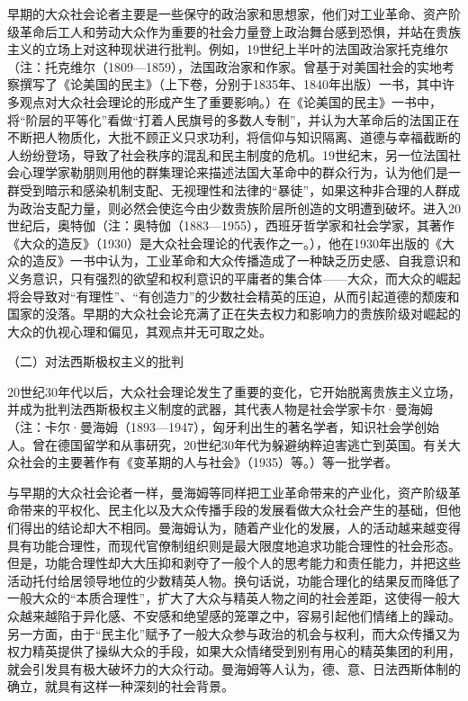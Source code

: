 \documentclass[UTF8,12pt]{ctexart}
\numberwithin{equation}{section} %
\numberwithin{figure}{section}
\numberwithin{table}{section}
\begin{document}
	早期的大众社会论者主要是一些保守的政治家和思想家，他们对工业革命、资产阶级革命后工人和劳动大众作为重要的社会力量登上政治舞台感到恐惧，并站在贵族主义的立场上对这种现状进行批判。例如，19世纪上半叶的法国政治家托克维尔（注：托克维尔（1809—1859），法国政治家和作家。曾基于对美国社会的实地考察撰写了《论美国的民主》（上下卷，分别于1835年、1840年出版）一书，其中许多观点对大众社会理论的形成产生了重要影响。）在《论美国的民主》一书中，将“阶层的平等化”看做“打着人民旗号的多数人专制”，并认为大革命后的法国正在不断把人物质化，大批不顾正义只求功利，将信仰与知识隔离、道德与幸福截断的人纷纷登场，导致了社会秩序的混乱和民主制度的危机。19世纪末，另一位法国社会心理学家勒朋则用他的群集理论来描述法国大革命中的群众行为，认为他们是一群受到暗示和感染机制支配、无视理性和法律的“暴徒”，如果这种非合理的人群成为政治支配力量，则必然会使迄今由少数贵族阶层所创造的文明遭到破坏。进入20世纪后，奥特伽（注：奥特伽（1883—1955），西班牙哲学家和社会学家，其著作《大众的造反》（1930）是大众社会理论的代表作之一。），他在1930年出版的《大众的造反》一书中认为，工业革命和大众传播造成了一种缺乏历史感、自我意识和义务意识，只有强烈的欲望和权利意识的平庸者的集合体——大众，而大众的崛起将会导致对“有理性”、“有创造力”的少数社会精英的压迫，从而引起道德的颓废和国家的没落。早期的大众社会论充满了正在失去权力和影响力的贵族阶级对崛起的大众的仇视心理和偏见，其观点并无可取之处。
	
	（二）对法西斯极权主义的批判
	
	20世纪30年代以后，大众社会理论发生了重要的变化，它开始脱离贵族主义立场，并成为批判法西斯极权主义制度的武器，其代表人物是社会学家卡尔·曼海姆（注：卡尔·曼海姆（1893—1947），匈牙利出生的著名学者，知识社会学创始人。曾在德国留学和从事研究，20世纪30年代为躲避纳粹迫害逃亡到英国。有关大众社会的主要著作有《变革期的人与社会》（1935）等。）等一批学者。
	
	与早期的大众社会论者一样，曼海姆等同样把工业革命带来的产业化，资产阶级革命带来的平权化、民主化以及大众传播手段的发展看做大众社会产生的基础，但他们得出的结论却大不相同。曼海姆认为，随着产业化的发展，人的活动越来越变得具有功能合理性，而现代官僚制组织则是最大限度地追求功能合理性的社会形态。但是，功能合理性却大大压抑和剥夺了一般个人的思考能力和责任能力，并把这些活动托付给居领导地位的少数精英人物。换句话说，功能合理化的结果反而降低了一般大众的“本质合理性”，扩大了大众与精英人物之间的社会差距，这使得一般大众越来越陷于异化感、不安感和绝望感的笼罩之中，容易引起他们情绪上的躁动。另一方面，由于“民主化”赋予了一般大众参与政治的机会与权利，而大众传播又为权力精英提供了操纵大众的手段，如果大众情绪受到别有用心的精英集团的利用，就会引发具有极大破坏力的大众行动。曼海姆等人认为，德、意、日法西斯体制的确立，就具有这样一种深刻的社会背景。
	
\end{document}
